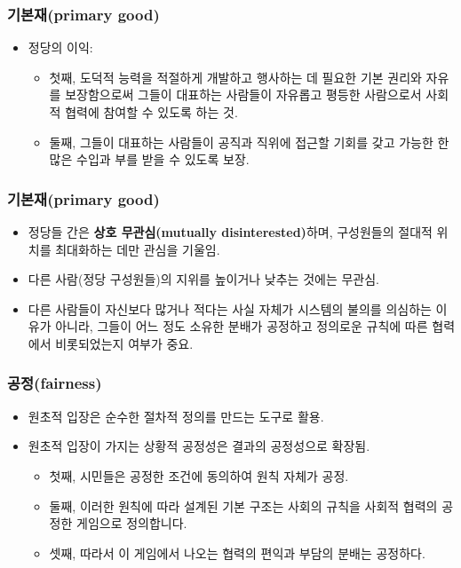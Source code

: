 \documentclass[aspectratio=169,xcolor=dvipsnames,handout]{beamer}
\begin{document}
\begin{frame}[<+->]
\frametitle{기본재(primary good)}
    \begin{itemize}
        \item  정당의 이익:
        \begin{itemize}
            \item  첫째, 도덕적 능력을 적절하게 개발하고 행사하는 데 필요한 기본 권리와 자유를 보장함으로써 그들이 대표하는 사람들이 자유롭고 평등한 사람으로서 사회적 협력에 참여할 수 있도록 하는 것.
            \item  둘째, 그들이 대표하는 사람들이 공직과 직위에 접근할 기회를 갖고 가능한 한 많은 수입과 부를 받을 수 있도록 보장.
        \end{itemize}
    \end{itemize}
\end{frame}

\begin{frame}[<+->]
\frametitle{기본재(primary good)}
    \begin{itemize}
        \item  정당들 간은 \textbf{상호 무관심(mutually disinterested)}하며, 구성원들의 절대적 위치를 최대화하는 데만 관심을 기울임.
        \item  다른 사람(정당 구성원들)의 지위를 높이거나 낮추는 것에는 무관심.
        \item  다른 사람들이 자신보다 많거나 적다는 사실 자체가 시스템의 불의를 의심하는 이유가 아니라, 그들이 어느 정도 소유한 분배가 공정하고 정의로운 규칙에 따른 협력에서 비롯되었는지 여부가 중요.
    \end{itemize}
\end{frame}

\begin{frame}[<+->]
\frametitle{공정(fairness)}
    \begin{itemize}
        \item 원초적 입장은 순수한 절차적 정의를 만드는 도구로 활용.
        \item 원초적 입장이 가지는 상황적 공정성은 결과의 공정성으로 확장됨.
        \begin{itemize}
            \item  첫째, 시민들은 공정한 조건에 동의하여 원칙 자체가 공정.
            \item  둘째, 이러한 원칙에 따라 설계된 기본 구조는 사회의 규칙을 사회적 협력의 공정한 게임으로 정의합니다.
            \item  셋째, 따라서 이 게임에서 나오는 협력의 편익과 부담의 분배는 공정하다.
        \end{itemize}
    \end{itemize}
\end{frame}
\end{document}
